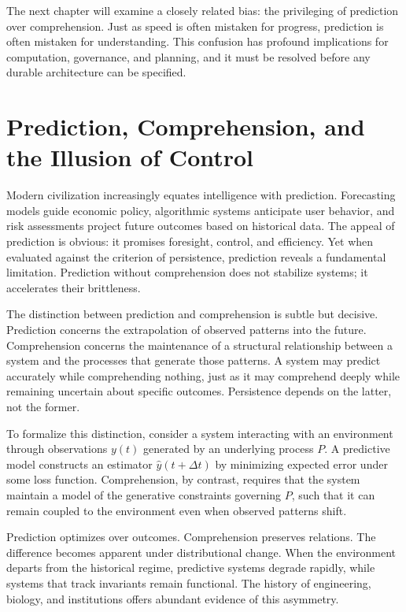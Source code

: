 \documentclass[12pt,oneside]{book}
\begin{document}
The next chapter will examine a closely related bias: the privileging of prediction over comprehension. Just as speed is often mistaken for progress, prediction is often mistaken for understanding. This confusion has profound implications for computation, governance, and planning, and it must be resolved before any durable architecture can be specified.

\chapter{Prediction, Comprehension, and the Illusion of Control}

Modern civilization increasingly equates intelligence with prediction. Forecasting models guide economic policy, algorithmic systems anticipate user behavior, and risk assessments project future outcomes based on historical data. The appeal of prediction is obvious: it promises foresight, control, and efficiency. Yet when evaluated against the criterion of persistence, prediction reveals a fundamental limitation. Prediction without comprehension does not stabilize systems; it accelerates their brittleness.

The distinction between prediction and comprehension is subtle but decisive. Prediction concerns the extrapolation of observed patterns into the future. Comprehension concerns the maintenance of a structural relationship between a system and the processes that generate those patterns. A system may predict accurately while comprehending nothing, just as it may comprehend deeply while remaining uncertain about specific outcomes. Persistence depends on the latter, not the former.

To formalize this distinction, consider a system interacting with an environment through observations \(y(t)\) generated by an underlying process \(P\). A predictive model constructs an estimator \(\hat{y}(t+\Delta t)\) by minimizing expected error under some loss function. Comprehension, by contrast, requires that the system maintain a model of the generative constraints governing \(P\), such that it can remain coupled to the environment even when observed patterns shift.

Prediction optimizes over outcomes. Comprehension preserves relations. The difference becomes apparent under distributional change. When the environment departs from the historical regime, predictive systems degrade rapidly, while systems that track invariants remain functional. The history of engineering, biology, and institutions offers abundant evidence of this asymmetry.
\end{document}
